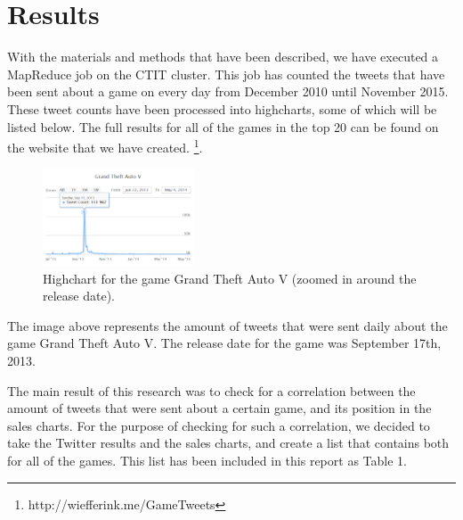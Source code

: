 \section{Results}
With the materials and methods that have been described, we have executed a MapReduce job on the CTIT cluster. This job has counted the tweets that have been sent about a game on every day from December 2010 until November 2015. These tweet counts have been processed into highcharts, some of which will be listed below. The full results for all of the games in the top 20 can be found on the website that we have created. \footnote{http://wiefferink.me/GameTweets}.

\begin{figure}[!ht]
	\centering
	\includegraphics[width=0.4\textwidth]{highchart-gta3}
	\caption{Highchart for the game Grand Theft Auto V (zoomed in around the release date).}
\end{figure}
\FloatBarrier

The image above represents the amount of tweets that were sent daily about the game Grand Theft Auto V.  The release date for the game was September 17th, 2013.

The main result of this research was to check for a correlation between the amount of tweets that were sent about a certain game, and its position in the sales charts. For the purpose of checking for such a correlation, we decided to take the Twitter results and the sales charts, and create a list that contains both for all of the games. This list has been included in this report as Table 1.